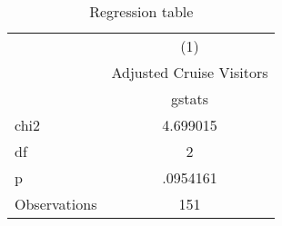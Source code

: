 \begin{table}[htbp]\centering
\def\sym#1{\ifmmode^{#1}\else\(^{#1}\)\fi}
\caption{Regression table\label{granger}}
\begin{tabular}{l*{1}{c}}
\hline\hline
                    &\multicolumn{1}{c}{(1)}\\
                    &\multicolumn{1}{c}{Adjusted Cruise Visitors}\\
                    &      gstats\\
\hline
chi2                &    4.699015\\
df                  &           2\\
p                   &    .0954161\\
\hline
Observations        &         151\\
\hline\hline
\end{tabular}
\end{table}
